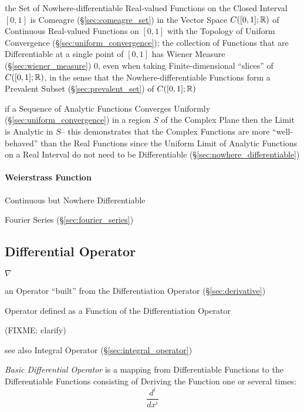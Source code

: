 the Set of Nowhere-differentiable Real-valued Functions on the Closed Interval
$[0,1]$ is Comeagre (\S\ref{sec:comeagre_set}) in the Vector Space $C([0,1];
\mathbb{R})$ of Continuous Real-valued Functions on $[0,1]$ with the Topology of
Uniform Convergence (\S\ref{sec:uniform_convergence}); the collection of
Functions that are Differentiable at a single point of $[0,1]$ has Wiener
Measure (\S\ref{sec:wiener_measure}) $0$, even when taking Finite-dimensional
``slices'' of $C([0,1];\mathbb{R})$, in the sense that the Nowhere-differentiable
Functions form a Prevalent Subset (\S\ref{sec:prevalent_set}) of
$C([0,1]; \mathbb{R})$

if a Sequence of Analytic Functions Converges Uniformly
(\S\ref{sec:uniform_convergence}) in a region $S$ of the Complex Plane then the
Limit is Analytic in $S$-- this demonstrates that the Complex Functions are
more ``well-behaved'' than the Real Functions since the Uniform Limit of
Analytic Functions on a Real Interval do not need to be Differentiable
(\S\ref{sec:nowhere_differentiable})



\paragraph{Weierstrass Function}\label{sec:weierstrass_function}\hfill

Continuous but Nowhere Differentiable

Fourier Series (\S\ref{sec:fourier_series})



\subsection{Differential Operator}\label{sec:differential_operator}

$\nabla$

an Operator ``built'' from the Differentiation Operator (\S\ref{sec:derivative})

Operator defined as a Function of the Differentiation Operator

(FIXME: clarify)

\fist see also Integral Operator (\S\ref{sec:integral_operator})

\emph{Basic Differential Operator} is a mapping from Differentiable Functions
to the Differentiable Functions consisting of Deriving the Function one or
several times:
\[
  \frac{d^i}{dx^i}
\]

